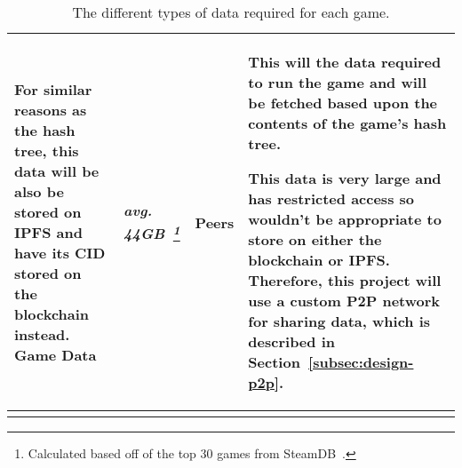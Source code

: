 \begin{longtable}{ p{} p{} p{} p{} }
  \vspace{1mm}
  \small For similar reasons as the hash tree, this data will be also be stored on IPFS and have its CID stored on the blockchain instead.
  \x
  Game Data
  & \textit{avg. 44GB~\footnote{Calculated based off of the top 30 games from SteamDB~\cite{noauthor_steam_nodate}.}}
  & Peers
  & This will the data required to run the game and will be fetched based upon the contents of the game's hash tree.

  \vspace{1mm}
  \small This data is very large and has restricted access so wouldn't be appropriate to store on either the blockchain or IPFS. Therefore, this project will use a custom P2P network for sharing data, which is described in Section~\ref{subsec:design-p2p}.
  \\\bottomrule\bottomrule
  \caption{The different types of data required for each game.}
  \label{tab:data}
\end{longtable}